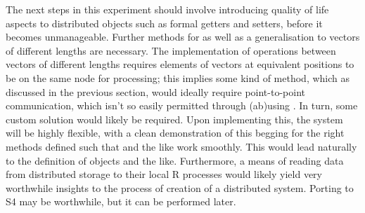 The next steps in this experiment should involve introducing quality of
life aspects to distributed objects such as formal getters and setters,
before it becomes unmanageable. Further methods for
 as well as a generalisation to vectors of
different lengths are necessary. The implementation of operations
between vectors of different lengths requires elements of vectors at
equivalent positions to be on the same node for processing; this implies
some kind of  method, which as discussed in the previous
section, would ideally require point-to-point communication, which isn't
so easily permitted through (ab)using . In turn, some custom
solution would likely be required. Upon implementing this, the system
will be highly flexible, with a clean demonstration of this begging for
the right methods defined such that  and the like work
smoothly. This would lead naturally to the definition of
 objects and the like. Furthermore, a
means of reading data from distributed storage to their local R
processes would likely yield very worthwhile insights to the process of
creation of a distributed \R{} system. Porting to S4 may be worthwhile, but
it can be performed later.
